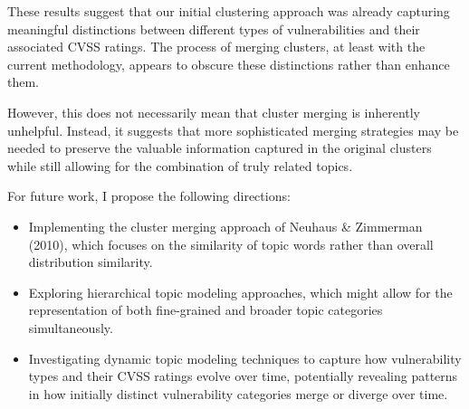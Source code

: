 These results suggest that our initial clustering approach was already capturing meaningful
distinctions between different types of vulnerabilities and their associated CVSS ratings. The
process of merging clusters, at least with the current methodology, appears to obscure these
distinctions rather than enhance them.

However, this does not necessarily mean that cluster merging is inherently unhelpful. Instead, it suggests that more sophisticated merging strategies may be needed to preserve the valuable information captured in the original clusters while still allowing for the combination of truly related topics.

For future work, I propose the following directions:

\begin{itemize}
	\item Implementing the cluster merging approach of Neuhaus \& Zimmerman (2010), which focuses on the similarity of topic words rather than overall distribution similarity.
	\item Exploring hierarchical topic modeling approaches, which might allow for the representation of both fine-grained and broader topic categories simultaneously.
	\item Investigating dynamic topic modeling techniques to capture how vulnerability types and their CVSS ratings evolve over time, potentially revealing patterns in how initially distinct vulnerability categories merge or diverge over time.
\end{itemize}


